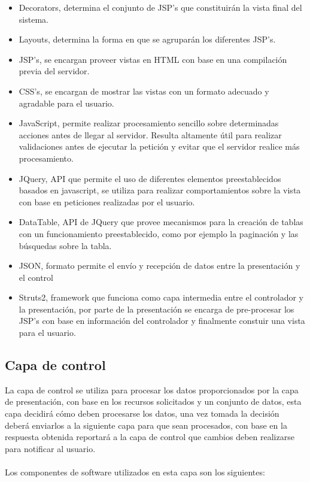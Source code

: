 \begin{itemize} 
	\item Decorators, determina el conjunto de JSP's que constituirán la vista final del sistema.
	\item Layouts, determina la forma en que se agruparán los diferentes JSP's.
	\item JSP's, se encargan proveer vistas en HTML con base en una compilación previa del servidor.
	\item CSS's, se encargan de mostrar las vistas con un formato adecuado y agradable para el usuario.
	\item JavaScript, permite realizar procesamiento sencillo sobre determinadas acciones antes de llegar al servidor. Resulta altamente útil para realizar validaciones antes de ejecutar la petición y evitar que el servidor realice más procesamiento.
	\item JQuery, API que permite el uso de diferentes elementos preestablecidos basados en javascript, se utiliza para realizar comportamientos sobre la vista con base en peticiones realizadas por el usuario.
	\item DataTable, API de JQuery que provee mecanismos para la creación de tablas con un funcionamiento preestablecido, como por ejemplo la paginación y las búsquedas sobre la tabla.
	\item JSON, formato permite el envío y recepción de datos entre la presentación y el control
	\item Struts2, framework que funciona como capa intermedia entre el controlador y la presentación, por parte de la presentación se encarga de pre-procesar los JSP's con base en información del controlador y finalmente constuir una vista para el usuario.
\end{itemize}

\subsection{Capa de control}

La capa de control se utiliza para procesar los datos proporcionados por la capa de presentación, con base en los recursos solicitados y un conjunto de datos, esta capa decidirá cómo deben procesarse los datos, una vez tomada la decisión deberá enviarlos a la siguiente capa para que sean procesados, con base en la respuesta obtenida reportará a la capa de control que cambios deben realizarse para notificar al usuario.\\\\
Los componentes de software utilizados en esta capa son los siguientes: \\


